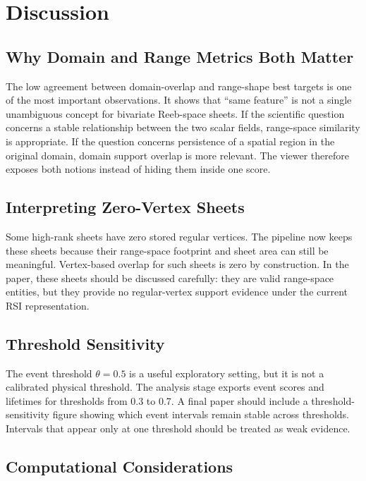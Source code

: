 \section{Discussion}

\subsection{Why Domain and Range Metrics Both Matter}

The low agreement between domain-overlap and range-shape best targets is one of
the most important observations. It shows that ``same feature'' is not a single
unambiguous concept for bivariate Reeb-space sheets. If the scientific question
concerns a stable relationship between the two scalar fields, range-space
similarity is appropriate. If the question concerns persistence of a spatial
region in the original domain, domain support overlap is more relevant. The
viewer therefore exposes both notions instead of hiding them inside one score.

\subsection{Interpreting Zero-Vertex Sheets}

Some high-rank sheets have zero stored regular vertices. The pipeline now keeps
these sheets because their range-space footprint and sheet area can still be
meaningful. Vertex-based overlap for such sheets is zero by construction. In
the paper, these sheets should be discussed carefully: they are valid
range-space entities, but they provide no regular-vertex support evidence under
the current RSI representation.

\subsection{Threshold Sensitivity}

The event threshold \(\theta=0.5\) is a useful exploratory setting, but it is
not a calibrated physical threshold. The analysis stage exports event scores
and lifetimes for thresholds from 0.3 to 0.7. A final paper should include a
threshold-sensitivity figure showing which event intervals remain stable across
thresholds. Intervals that appear only at one threshold should be treated as
weak evidence.

\subsection{Computational Considerations}

